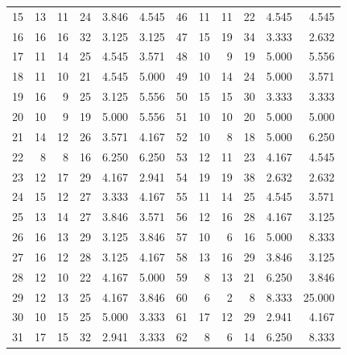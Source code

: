 \documentclass[11pt,a4paper]{article}
\begin{document}
\begin{table}[htbp]
\begin{tabular}{@{}rrrrrr@{\hspace{9pt}}rrrrrr@{}}
15 & 13 & 11 & 24 & 3.846 & 4.545 & 46 & 11 & 11 & 22 & 4.545 & 4.545\\
16 & 16 & 16 & 32 & 3.125 & 3.125 & 47 & 15 & 19 & 34 & 3.333 & 2.632\\
17 & 11 & 14 & 25 & 4.545 & 3.571 & 48 & 10 & 9 & 19 & 5.000 & 5.556\\
18 & 11 & 10 & 21 & 4.545 & 5.000 & 49 & 10 & 14 & 24 & 5.000 & 3.571\\
19 & 16 & 9 & 25 & 3.125 & 5.556 & 50 & 15 & 15 & 30 & 3.333 & 3.333\\
20 & 10 & 9 & 19 & 5.000 & 5.556 & 51 & 10 & 10 & 20 & 5.000 & 5.000\\
21 & 14 & 12 & 26 & 3.571 & 4.167 & 52 & 10 & 8 & 18 & 5.000 & 6.250\\
22 & 8 & 8 & 16 & 6.250 & 6.250 & 53 & 12 & 11 & 23 & 4.167 & 4.545\\
23 & 12 & 17 & 29 & 4.167 & 2.941 & 54 & 19 & 19 & 38 & 2.632 & 2.632\\
24 & 15 & 12 & 27 & 3.333 & 4.167 & 55 & 11 & 14 & 25 & 4.545 & 3.571\\
25 & 13 & 14 & 27 & 3.846 & 3.571 & 56 & 12 & 16 & 28 & 4.167 & 3.125\\
26 & 16 & 13 & 29 & 3.125 & 3.846 & 57 & 10 & 6 & 16 & 5.000 & 8.333\\
27 & 16 & 12 & 28 & 3.125 & 4.167 & 58 & 13 & 16 & 29 & 3.846 & 3.125\\
28 & 12 & 10 & 22 & 4.167 & 5.000 & 59 & 8 & 13 & 21 & 6.250 & 3.846\\
29 & 12 & 13 & 25 & 4.167 & 3.846 & 60 & 6 & 2 & 8 & 8.333 & 25.000\\
30 & 10 & 15 & 25 & 5.000 & 3.333 & 61 & 17 & 12 & 29 & 2.941 & 4.167\\
31 & 17 & 15 & 32 & 2.941 & 3.333 & 62 & 8 & 6 & 14 & 6.250 & 8.333\\
\bottomrule
\end{tabular}
\end{table}
\end{document}
